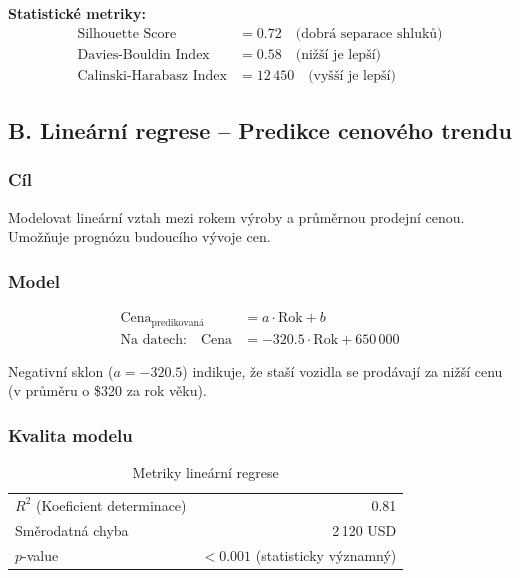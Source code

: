 \documentclass[12pt,a4paper]{article}
\begin{document}
\vspace{0.3cm}
\textbf{Statistické metriky:}
\begin{align*}
    \text{Silhouette Score} &= 0.72 \quad \text{(dobrá separace shluků)} \\
    \text{Davies-Bouldin Index} &= 0.58 \quad \text{(nižší je lepší)} \\
    \text{Calinski-Harabasz Index} &= 12\,450 \quad \text{(vyšší je lepší)}
\end{align*}

\subsection{B. Lineární regrese – Predikce cenového trendu}

\subsubsection{Cíl}

Modelovat lineární vztah mezi rokem výroby a průměrnou prodejní cenou. Umožňuje
prognózu budoucího vývoje cen.

\subsubsection{Model}

\begin{align*}
    \text{Cena}_{\text{predikovaná}} &= a \cdot \text{Rok} + b \\
    \text{Na datech:} \quad \text{Cena} &= -320.5 \cdot \text{Rok} + 650\,000
\end{align*}

Negativní sklon ($a = -320.5$) indikuje, že staší vozidla se prodávají za nižší cenu
(v průměru o \$320 za rok věku).

\subsubsection{Kvalita modelu}

\begin{table}[H]
    \centering
    \caption{Metriky lineární regrese}
    \begin{tabular}{|l|r|}
        \hline
        $R^2$ (Koeficient determinace) & 0.81 \\
        Směrodatná chyba & 2\,120 USD \\
        $p$-value & $< 0.001$ (statisticky významný) \\
        \hline
    \end{tabular}
\end{table}
\end{document}
